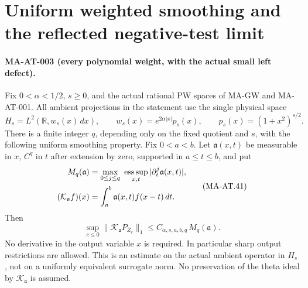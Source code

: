 \section{Uniform weighted smoothing and the reflected negative-test limit}
\label{sec:weighted-negative-pw-trace}

\paragraph{MA-AT-003 (every polynomial weight, with the actual small left
defect).}
Fix \(0<\alpha<1/2\), \(s\ge0\), and the actual rational PW spaces
of MA-GW and MA-AT-001.  All ambient projections in the statement use
the single physical space
\[
 H_s=L^2(\mathbb R,w_s(x)\,dx),\qquad
 w_s(x)=e^{2\alpha|x|}p_s(x),\qquad
 p_s(x)=(1+x^2)^{s/2}.
 \tag{MA-AT.40}
\]
There is a finite integer \(q\), depending only on the fixed
quotient and \(s\), with the following uniform smoothing property.
Fix \(0<a<b\).  Let \(\mathfrak a(x,t)\) be measurable in \(x\),
\(C^q\) in \(t\) after extension by zero, supported in
\(a\le t\le b\), and put
\[
 \begin{aligned}
 M_q(\mathfrak a)
   &=\max_{0\le j\le q}\ \mathop{\rm ess\,sup}_{x,t}
                         |\partial_t^j\mathfrak a(x,t)|,\\
 (\mathcal K_{\mathfrak a}f)(x)
   &=\int_a^b\mathfrak a(x,t)f(x-t)\,dt .
 \end{aligned}
 \tag{MA-AT.41}
\]
Then
\[
 \sup_{c\le0}
       \|\mathcal K_{\mathfrak a}P_{Z_c}\|_1
        \le C_{\alpha,s,a,b,q}\,M_q(\mathfrak a).
 \tag{MA-AT.42}
\]
No derivative in the output variable \(x\) is required.
In particular sharp output restrictions are allowed.
This is an estimate on the actual ambient operator in \(H_s\),
not on a uniformly equivalent surrogate norm.
No preservation of the theta ideal by \(\mathcal K_{\mathfrak a}\)
is assumed.

